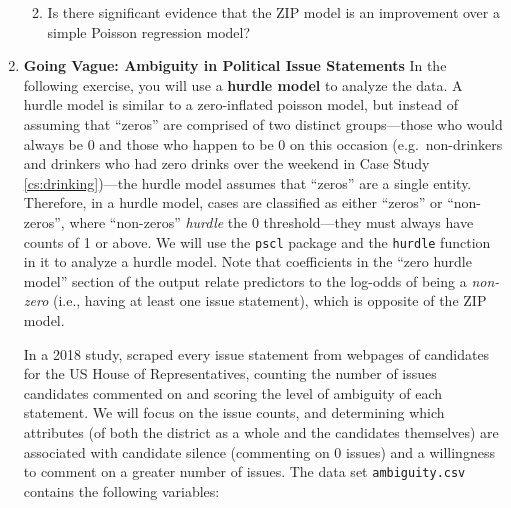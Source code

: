 \documentclass[
]{krantz}
\providecommand{\tightlist}{%
  \setlength{\itemsep}{0pt}\setlength{\parskip}{0pt}}
\begin{document}
\begin{enumerate}
  \begin{enumerate}
  \def\labelenumii{\alph{enumii}.}
  \setcounter{enumii}{2}
  \tightlist
  \item
    Is there significant evidence that the ZIP model is an improvement over a simple Poisson regression model?
  \end{enumerate}
\item
  \textbf{Going Vague: Ambiguity in Political Issue Statements} In the following exercise, you will use a \textbf{hurdle model}  to analyze the data. A hurdle model is similar to a zero-inflated poisson model, but instead of assuming that ``zeros'' are comprised of two distinct groups---those who would always be 0 and those who happen to be 0 on this occasion (e.g.~non-drinkers and drinkers who had zero drinks over the weekend in Case Study \ref{cs:drinking})---the hurdle model assumes that ``zeros'' are a single entity. Therefore, in a hurdle model, cases are classified as either ``zeros'' or ``non-zeros'', where ``non-zeros'' \emph{hurdle} the 0 threshold---they must always have counts of 1 or above. We will use the \texttt{pscl} package and the \texttt{hurdle} function in it to analyze a hurdle model. Note that coefficients in the ``zero hurdle model'' section of the output relate predictors to the log-odds of being a \emph{non-zero} (i.e., having at least one issue statement), which is opposite of the ZIP model.

  In a 2018 study, \citet{Chapp2018} scraped every issue statement from webpages of candidates for the US House of Representatives, counting the number of issues candidates commented on and scoring the level of ambiguity of each statement. We will focus on the issue counts, and determining which attributes (of both the district as a whole and the candidates themselves) are associated with candidate silence (commenting on 0 issues) and a willingness to comment on a greater number of issues. The data set \texttt{ambiguity.csv} contains the following variables:


\end{enumerate}
\end{document}
